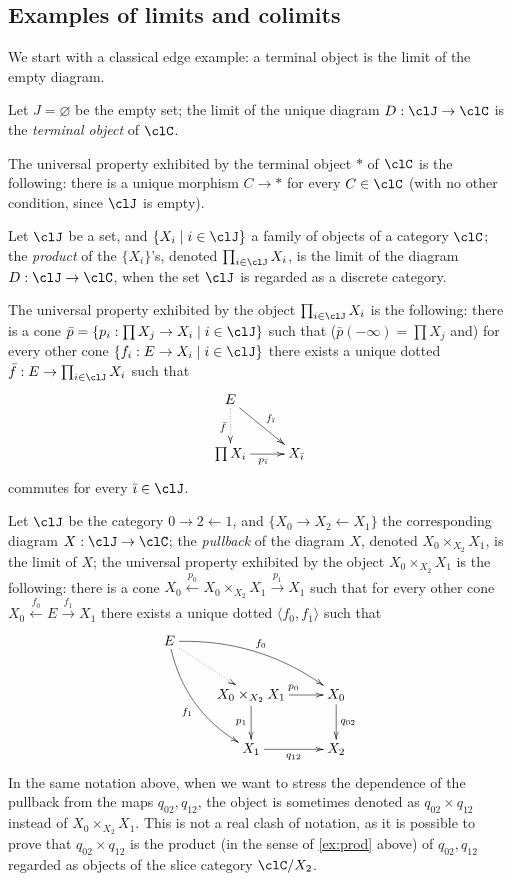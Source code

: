 \documentclass[11pt]{article}
\begin{document}
\subsection{Examples of limits and colimits}
We start with a classical edge example: a terminal object is the limit of the empty diagram.
\begin{example}
	Let $J=\varnothing$ be the empty set; the limit of the unique diagram $D : \clJ \to \clC$ is the \emph{terminal object} of $\clC$.

	The universal property exhibited by the terminal object $*$ of $\clC$ is the following: there is a unique morphism $C\to *$ for every $C\in\clC$ (with no other condition, since $\clJ$ is empty).
\end{example}
\begin{example}[Product]\label{ex:prod}
	Let $\clJ$ be a set, and $\{X_i \mid i\in \clJ\}$ a family of objects of a category $\clC$; the \emph{product} of the $\{X_i\}$'s, denoted $\prod_{i\in \clJ} X_i$, is the limit of the diagram $D : \clJ \to \clC$, when the set $\clJ$ is regarded as a discrete category.%

	The universal property exhibited by the object $\prod_{i\in \clJ} X_i$ is the following: there is a cone $\bar p = \{p_i : \prod X_j \to X_i\mid i\in \clJ\}$ such that ($\bar p(-\infty) = \prod X_j$ and) for every other cone $\{f_i : E\to X_i \mid i\in \clJ\}$ there exists a unique dotted $\bar f : E \to \prod_{i\in \clJ} X_i$ such that
	\[
		\vcenter{\xymatrix{		E \ar@{.>}[d]_{\bar f}\ar[dr]^{f_{\bar\imath}} & \\
		\prod X_i \ar[r]_{p_{\bar\imath}}& X_{\bar\imath}
		}}
	\]
	commutes for every $\bar\imath \in \clJ$.
\end{example}
\begin{example}[Pullback]\label{ex:pull}
	Let $\clJ$ be the category $0\to 2\leftarrow 1$, and $\{X_0 \to X_2 \leftarrow X_1\}$ the corresponding diagram $X : \clJ\to \clC$; the \emph{pullback} of the diagram $X$, denoted $X_0 \times_{X_2} X_1$, is the limit of $X$; the universal property exhibited by the object $X_0 \times_{X_2} X_1$ is the following: there is a cone $X_0 \xleftarrow{p_0} X_0\times_{X_2}X_1 \xrightarrow{p_1} X_1$ such that for every other cone $X_0 \xleftarrow{f_0} E \xrightarrow{f_1} X_1$ there exists a unique dotted $\langle f_0,f_1\rangle$ such that
	\[
		\vcenter{\xymatrix{
		E \ar@{.>}[dr]\ar@/^1pc/[drr]^{f_0}\ar@/_1pc/[ddr]_{f_1}&& \\
		& X_0 \times_{X_2} X_1 \ar[d]_{p_1} \ar[r]^{p_0} & X_0\ar[d]^{q_{02}} \\
		& X_1 \ar[r]_{q_{12}}& X_2
		}}
	\]
	In the same notation above, when we want to stress the dependence of the pullback from the maps $q_{02}, q_{12}$, the object is sometimes denoted as $q_{02}\times q_{12}$ instead of $X_0 \times_{X_2} X_1$. This is not a real clash of notation, as it is possible to prove that $q_{02}\times q_{12}$ is the product (in the sense of \ref{ex:prod} above) of $q_{02}, q_{12}$ regarded as objects of the slice category $\clC/X_2$.
\end{example}
\end{document}
